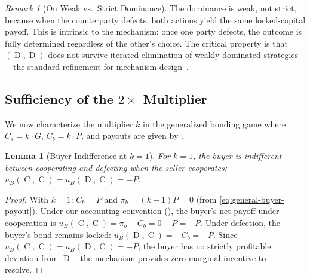 \documentclass[11pt,a4paper]{article}
\newtheorem{lemma}[theorem]{Lemma}
\theoremstyle{definition}
\theoremstyle{remark}
\newtheorem{remark}[theorem]{Remark}
\newcommand{\pay}{P}           %
\newcommand{\cumval}{G}        %
\newcommand{\sbond}{C_s}       %
\newcommand{\bbond}{C_b}       %
\newcommand{\bpay}{\pi_b}      %
\newcommand{\ub}{u_B}          %
\DeclareMathOperator{\Coop}{C}
\DeclareMathOperator{\Def}{D}
\begin{document}
\begin{remark}[On Weak vs.\ Strict Dominance]
\label{rem:dominance-note}
The dominance is weak, not strict, because when the counterparty
defects, both actions yield the same locked-capital payoff. This is
intrinsic to the mechanism: once one party defects, the outcome is
fully determined regardless of the other's choice. The critical
property is that $(\Def, \Def)$ does not survive iterated elimination
of weakly dominated strategies---the standard refinement for
mechanism design~\citep{myerson1979}.
\end{remark}

\subsection{Sufficiency of the $2\times$ Multiplier}

We now characterize the multiplier $k$ in the generalized bonding game
where $\sbond = k \cdot \cumval$, $\bbond = k \cdot \pay$, and
payouts are given by .

\begin{lemma}[Buyer Indifference at $k = 1$]
\label{lem:k1-buyer}
For $k = 1$, the buyer is indifferent between cooperating and defecting
when the seller cooperates:
$\ub(\Coop, \Coop) = \ub(\Def, \Coop) = -\pay$.
\end{lemma}
\begin{proof}
With $k = 1$: $\bbond = \pay$ and $\bpay = (k-1)\pay = 0$ (from
\eqref{eq:general-buyer-payout}). Under our accounting convention
(), the buyer's net payoff under cooperation
is $\ub(\Coop, \Coop) = \bpay - \bbond = 0 - \pay = -\pay$. Under
defection, the buyer's bond remains locked:
$\ub(\Def, \Coop) = -\bbond = -\pay$. Since
$\ub(\Coop, \Coop) = \ub(\Def, \Coop) = -\pay$, the buyer has no
strictly profitable deviation from $\Def$---the mechanism provides
zero marginal incentive to resolve.
\end{proof}
\end{document}
